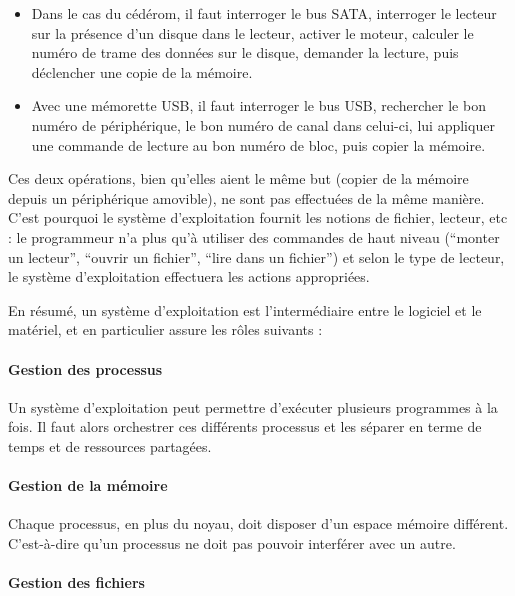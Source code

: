 \begin{itemize}

  \item Dans le cas du cédérom, il faut interroger le bus SATA, interroger le
    lecteur sur la présence d'un disque dans le lecteur, activer le moteur,
    calculer le numéro de trame des données sur le disque, demander la lecture,
    puis déclencher une
    copie de la mémoire.

  \item Avec une mémorette USB, il faut interroger le bus USB, rechercher le bon
    numéro de périphérique, le bon numéro de canal dans celui-ci, lui appliquer
    une commande de lecture au bon numéro de bloc, puis copier la mémoire.

\end{itemize}

Ces deux opérations, bien qu'elles aient le même but (copier de la mémoire
depuis un périphérique amovible), ne sont pas effectuées de la même manière.
C'est pourquoi le système d'exploitation fournit les notions de fichier,
lecteur, etc : le programmeur n'a plus qu'à utiliser des commandes de haut
niveau (``monter un lecteur'', ``ouvrir un fichier'', ``lire dans un fichier'')
et selon le type de lecteur, le système d'exploitation effectuera les actions
appropriées.

En résumé, un système d'exploitation est l'intermédiaire entre le logiciel et
le matériel, et en particulier assure les rôles suivants :


\paragraph{Gestion des processus}

Un système d'exploitation peut permettre d'exécuter plusieurs programmes à la
fois. Il faut alors orchestrer ces différents processus et les séparer en terme
de temps et de ressources partagées.

\paragraph{Gestion de la mémoire}

Chaque processus, en plus du noyau, doit disposer d'un espace mémoire différent.
C'est-à-dire qu'un processus ne doit pas pouvoir interférer avec un autre.

\paragraph{Gestion des fichiers}

